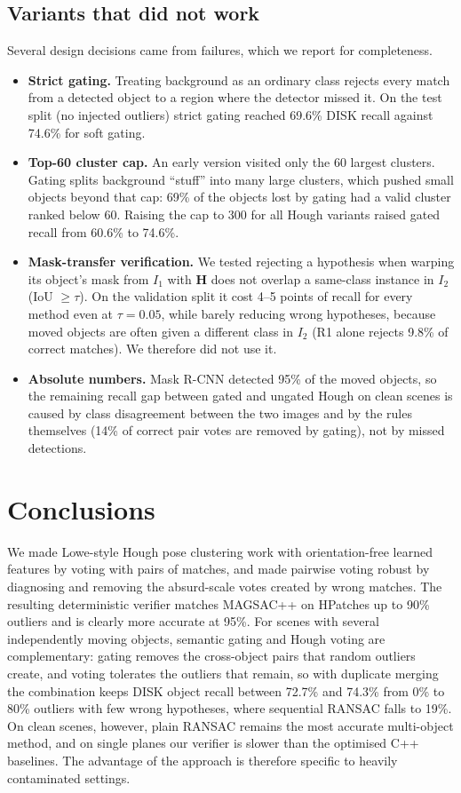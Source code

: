 \documentclass{article}
\begin{document}
\subsection{Variants that did not work}
Several design decisions came from failures, which we report for
completeness.
\begin{itemize}
  \item \textbf{Strict gating.} Treating background as an ordinary class
  rejects every match from a detected object to a region where the detector
  missed it. On the test split (no injected outliers) strict gating reached
  69.6\% DISK recall against 74.6\% for soft gating.
  \item \textbf{Top-60 cluster cap.} An early version visited only the 60
  largest clusters. Gating splits background ``stuff'' into many large
  clusters, which pushed small objects beyond that cap: 69\% of the objects
  lost by gating had a valid cluster ranked below 60. Raising the cap to 300
  for all Hough variants raised gated recall from 60.6\% to 74.6\%.
  \item \textbf{Mask-transfer verification.} We tested rejecting a hypothesis
  when warping its object's mask from $I_1$ with $\mathbf{H}$ does not overlap
  a same-class instance in $I_2$ (IoU $\ge\tau$). On the validation split it
  cost 4--5 points of recall for every method even at $\tau=0.05$, while
  barely reducing wrong hypotheses, because moved objects are often given a
  different class in $I_2$ (R1 alone rejects 9.8\% of correct matches). We
  therefore did not use it.
  \item \textbf{Absolute numbers.} Mask R-CNN detected 95\% of the moved
  objects, so the remaining recall gap between gated and ungated Hough on
  clean scenes is caused by class disagreement between the two images and by
  the rules themselves (14\% of correct pair votes are removed by gating),
  not by missed detections.
\end{itemize}

\section{Conclusions}

We made Lowe-style Hough pose clustering work with orientation-free learned
features by voting with pairs of matches, and made pairwise voting robust by
diagnosing and removing the absurd-scale votes created by wrong matches. The
resulting deterministic verifier matches MAGSAC++ on HPatches up to 90\%
outliers and is clearly more accurate at 95\%. For scenes with several
independently moving objects, semantic gating and Hough voting are
complementary: gating removes the cross-object pairs that random outliers
create, and voting tolerates the outliers that remain, so with duplicate
merging the combination keeps DISK object recall between 72.7\% and 74.3\%
from 0\% to 80\% outliers with few wrong hypotheses, where sequential RANSAC falls to
19\%. On clean scenes, however, plain RANSAC remains the most accurate
multi-object method, and on single planes our verifier is slower than the
optimised C++ baselines. The advantage of the approach is therefore
specific to heavily contaminated settings.
\end{document}
